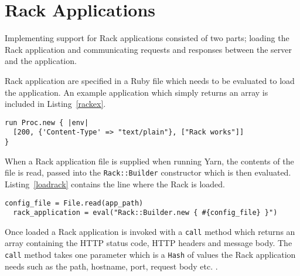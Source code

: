 \section{Rack Applications}
\label{rack}
Implementing support for Rack applications consisted of two parts; loading the
Rack application and communicating requests and responses between the server
and the application.

Rack application are specified in a Ruby file which needs to be evaluated to
load the application. An example application which simply returns
an array is included in Listing~\ref{rackex}.

\newpage
\begin{lstlisting}[label=rackex,caption=Sample Rack application. (test\_objects/config.ru:4)]
run Proc.new { |env|
  [200, {'Content-Type' => "text/plain"}, ["Rack works"]]
}
\end{lstlisting}

When a Rack application file is supplied when running Yarn, the contents of
the file is read, passed into the \texttt{Rack::Builder} constructor which is
then evaluated. Listing~\ref{loadrack} contains the line where the Rack is
loaded.

\bigskip
\begin{lstlisting}[label=loadrack,caption=Loading a Rack application.
(lib/yarn/server.rb:31)]
  config_file = File.read(app_path)
  rack_application = eval("Rack::Builder.new { #{config_file} }")
\end{lstlisting}

Once loaded a Rack application is invoked with a \texttt{call} method which
returns an array containing the HTTP status code, HTTP headers and message
body. The \texttt{call} method takes one parameter which is a
\texttt{Hash} of values the Rack application needs such as the path, hostname,
port, request body etc. \cite{rackspec}. 




